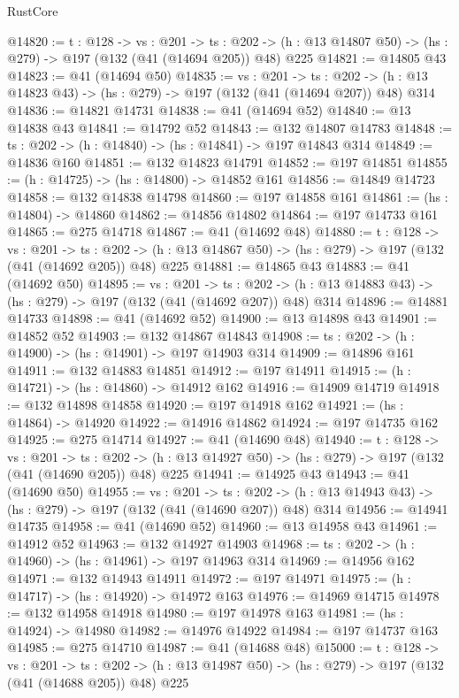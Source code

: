 \begin{lexlean}{RustCore}
\begin{coremodule}
@14820 := {t : @128} ->
  {vs : @201} ->
  {ts : @202} -> (h : @13 @14807 @50) -> (hs : @279) -> @197 (@132 (@41 (@14694 @205)) @48) @225
@14821 := @14805 @43
@14823 := @41 (@14694 @50)
@14835 := {vs : @201} ->
  {ts : @202} -> (h : @13 @14823 @43) -> (hs : @279) -> @197 (@132 (@41 (@14694 @207)) @48) @314
@14836 := @14821 @14731
@14838 := @41 (@14694 @52)
@14840 := @13 @14838 @43
@14841 := @14792 @52
@14843 := @132 @14807 @14783
@14848 := {ts : @202} -> (h : @14840) -> (hs : @14841) -> @197 @14843 @314
@14849 := @14836 @160
@14851 := @132 @14823 @14791
@14852 := @197 @14851
@14855 := (h : @14725) -> (hs : @14800) -> @14852 @161
@14856 := @14849 @14723
@14858 := @132 @14838 @14798
@14860 := @197 @14858 @161
@14861 := (hs : @14804) -> @14860
@14862 := @14856 @14802
@14864 := @197 @14733 @161
@14865 := @275 @14718
@14867 := @41 (@14692 @48)
@14880 := {t : @128} ->
  {vs : @201} ->
  {ts : @202} -> (h : @13 @14867 @50) -> (hs : @279) -> @197 (@132 (@41 (@14692 @205)) @48) @225
@14881 := @14865 @43
@14883 := @41 (@14692 @50)
@14895 := {vs : @201} ->
  {ts : @202} -> (h : @13 @14883 @43) -> (hs : @279) -> @197 (@132 (@41 (@14692 @207)) @48) @314
@14896 := @14881 @14733
@14898 := @41 (@14692 @52)
@14900 := @13 @14898 @43
@14901 := @14852 @52
@14903 := @132 @14867 @14843
@14908 := {ts : @202} -> (h : @14900) -> (hs : @14901) -> @197 @14903 @314
@14909 := @14896 @161
@14911 := @132 @14883 @14851
@14912 := @197 @14911
@14915 := (h : @14721) -> (hs : @14860) -> @14912 @162
@14916 := @14909 @14719
@14918 := @132 @14898 @14858
@14920 := @197 @14918 @162
@14921 := (hs : @14864) -> @14920
@14922 := @14916 @14862
@14924 := @197 @14735 @162
@14925 := @275 @14714
@14927 := @41 (@14690 @48)
@14940 := {t : @128} ->
  {vs : @201} ->
  {ts : @202} -> (h : @13 @14927 @50) -> (hs : @279) -> @197 (@132 (@41 (@14690 @205)) @48) @225
@14941 := @14925 @43
@14943 := @41 (@14690 @50)
@14955 := {vs : @201} ->
  {ts : @202} -> (h : @13 @14943 @43) -> (hs : @279) -> @197 (@132 (@41 (@14690 @207)) @48) @314
@14956 := @14941 @14735
@14958 := @41 (@14690 @52)
@14960 := @13 @14958 @43
@14961 := @14912 @52
@14963 := @132 @14927 @14903
@14968 := {ts : @202} -> (h : @14960) -> (hs : @14961) -> @197 @14963 @314
@14969 := @14956 @162
@14971 := @132 @14943 @14911
@14972 := @197 @14971
@14975 := (h : @14717) -> (hs : @14920) -> @14972 @163
@14976 := @14969 @14715
@14978 := @132 @14958 @14918
@14980 := @197 @14978 @163
@14981 := (hs : @14924) -> @14980
@14982 := @14976 @14922
@14984 := @197 @14737 @163
@14985 := @275 @14710
@14987 := @41 (@14688 @48)
@15000 := {t : @128} ->
  {vs : @201} ->
  {ts : @202} -> (h : @13 @14987 @50) -> (hs : @279) -> @197 (@132 (@41 (@14688 @205)) @48) @225

\end{coremodule}
\end{lexlean}
